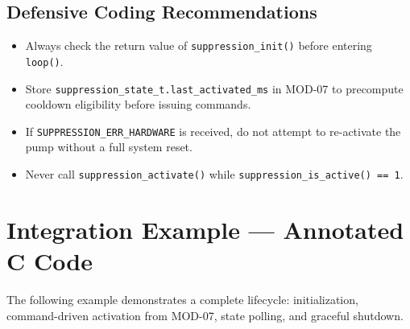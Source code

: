 \documentclass[12pt]{article}
\begin{document}
\subsection{Defensive Coding Recommendations}

\begin{itemize}[leftmargin=1.5em]
  \item Always check the return value of \texttt{suppression\_init()} before entering \texttt{loop()}.
  \item Store \texttt{suppression\_state\_t.last\_activated\_ms} in MOD-07 to precompute cooldown eligibility before issuing commands.
  \item If \texttt{SUPPRESSION\_ERR\_HARDWARE} is received, do not attempt to re-activate the pump without a full system reset.
  \item Never call \texttt{suppression\_activate()} while \texttt{suppression\_is\_active() == 1}.
\end{itemize}

\section{Integration Example --- Annotated C Code}

The following example demonstrates a complete lifecycle: initialization, command-driven activation from MOD-07, state polling, and graceful shutdown.
\end{document}
